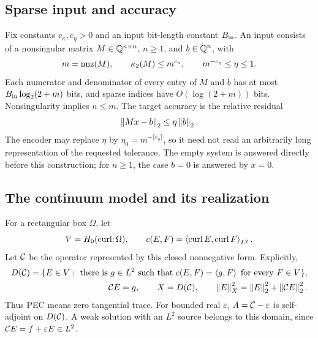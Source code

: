 \subsection{Sparse input and accuracy}\label{si:sec:input}
Fix constants $c_\kappa,c_\eta>0$ and an input bit-length constant $B_{\rm in}$. An
input consists of a nonsingular matrix $M\in\mathbb Q^{n\times n}$, $n\ge1$, and
$b\in\mathbb Q^n$, with
\begin{equation}
 m=\operatorname{nnz}(M),\qquad \kappa_2(M)\le m^{c_\kappa},
 \qquad m^{-c_\eta}\le\eta\le1.                         \label{c:eq:input}
\end{equation}
Each numerator and denominator of every entry of $M$ and $b$ has at most
$B_{\rm in}\log_2(2+m)$ bits, and sparse indices have $O(\log(2+m))$
bits. Nonsingularity implies $n\le m$. The target accuracy is the
relative residual
\begin{equation}
 \left\lVert Mx-b\right\rVert_2\le\eta\left\lVert b\right\rVert_2.                    \label{c:eq:target}
\end{equation}
The encoder may replace $\eta$ by $\eta_0=m^{-\lceil c_\eta\rceil}$, so it
need not read an arbitrarily long representation of the requested
tolerance. The empty system is answered directly before this construction;
for $n\ge1$, the case $b=0$ is answered by $x=0$.

\subsection{The continuum model and its realization}\label{c:sec:statement}

For a rectangular box $\Omega$, let
\begin{equation}
 V=H_0(\operatorname{curl};\Omega),\qquad
 c(E,F)=\left\langle \operatorname{curl} E,\operatorname{curl} F\right\rangle_{L^2}.
                                                               \label{c:eq:form}
\end{equation}
Let $\mathcal C$ be the operator represented by this closed nonnegative form.
Explicitly,
\begin{equation}
 \begin{split}
 D(\mathcal C)=\{E\in V:\text{ there is }g\in L^2\text{ such that }
 c(E,F)=\left\langle g,F\right\rangle\text{ for every }F\in V\},\\
 \mathcal C E=g,
 \qquad X=D(\mathcal C),\qquad
 \left\lVert E\right\rVert_X^2=\left\lVert E\right\rVert_2^2+\left\lVert \mathcal C E\right\rVert_2^2.
 \end{split}                                                   \label{c:eq:domain}
\end{equation}
Thus PEC means zero tangential trace. For bounded real $\varepsilon$,
$A=\mathcal C-\varepsilon$ is self-adjoint on $D(\mathcal C)$. A weak solution with
an $L^2$ source belongs to this domain, since
$\mathcal C E=f+\varepsilon E\in L^2$.


